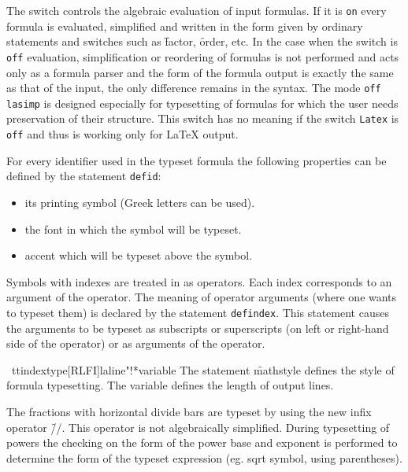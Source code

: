 The switch  controls the algebraic evaluation of input
formulas.  If it is \texttt{on} every formula is evaluated, simplified and
written in the form given by ordinary \REDUCE{} statements and switches
such as \f{factor}, \f{order},  etc.  In the case when the
 switch is \texttt{off} evaluation, simplification or
reordering of formulas is not performed and \REDUCE{} acts only as a
formula parser and the form of the formula output is exactly the same as
that of the input, the only difference remains in the syntax.  The mode
\texttt{off lasimp} is designed especially for typesetting of formulas for
which the user needs preservation of their structure.  This switch has
no meaning if the switch \texttt{Latex} is \texttt{off} and thus is working
only for \LaTeX{} output.

\hypertarget{command:DEFID}{}
For every  identifier  used  in  the  typeset  \REDUCE{}  formula
the following properties can be defined by the statement \texttt{defid}:
\begin{itemize}
\item its printing symbol (Greek letters can be used).
\item the font in which the symbol will be typeset.
\item accent which will be typeset above the symbol.
\end{itemize}

\hypertarget{command:DEFINDEX}{}
Symbols with indexes are treated in \REDUCE{} as operators.  Each index
corresponds to an argument of the operator.  The meaning of operator
arguments (where one wants to typeset them) is declared by the statement
\texttt{defindex}.  This statement causes the arguments to be typeset as
subscripts or superscripts (on left or right-hand side of the operator)
or as arguments of the operator.

\hypertarget{command:MATHSTYLE}{}\
ttindextype[RLFI]{laline"!*}{variable}
\hypertarget{reserved:LALINE!*}{}
The statement \f{mathstyle} defines the style of formula typesetting.
The variable \var{laline!*} defines the length of output lines.

The fractions with horizontal divide bars are typeset by using the
new \REDUCE{} infix operator \f{//}.  This operator is not
algebraically simplified.  During typesetting of powers the checking on
the form of the power base and exponent is performed to determine the
form of the typeset expression (eg.  sqrt symbol, using parentheses).

